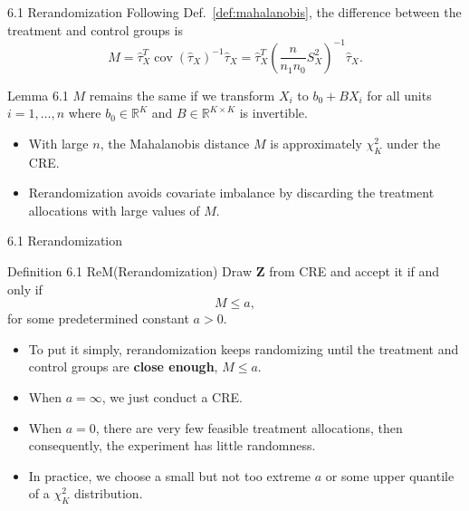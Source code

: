 \documentclass[aspectratio=169, 12pt]{beamer}
\begin{document}
\begin{frame}[label=lemma-6-1]{6.1 Rerandomization}
  Following Def.~\ref{def:mahalanobis}, the difference between the treatment and control groups is 
  \[
  M 
  = \widehat{\tau}_X^T\operatorname{cov}(\widehat{\tau}_X)^{-1}\widehat{\tau}_X 
  = \widehat{\tau}_X^T\left(\frac{n}{n_1n_0}S_X^2\right)^{-1}\widehat{\tau}_X.
  \]
  \begin{keybox}{Lemma 6.1}
    $M$ remains the same if we transform $X_i$ to $b_0+BX_i$ for all units $i=1,\dots,n$ where $b_0\in \mathbb{R}^K$ and $B\in\mathbb{R}^{K\times K}$ is invertible.
    \label{lemma1}
    \vfill
    \hfill\hyperlink{pr-lemma-6-1<1>}{}
  \end{keybox}
  \begin{itemize}
    \item With large $n$, the Mahalanobis distance $M$ is approximately $\chi_K^2$ under the CRE.
    \item Rerandomization avoids covariate imbalance by discarding the treatment allocations with large values of $M$.
  \end{itemize}
\end{frame}

\begin{frame}{6.1 Rerandomization}
  \begin{keybox}{Definition 6.1 ReM(Rerandomization)}
    Draw $\bm{Z}$ from CRE and accept it if and only if 
    \[
    M \leq a,
    \]
    for some predetermined constant $a>0$.
  \end{keybox}
  \begin{itemize}
    \item To put it simply, rerandomization keeps randomizing until the treatment and control groups are \textbf{close enough}, $M \le a$.
    \item When $a=\infty$, we just conduct a CRE.
    \item When $a=0$, there are very few feasible treatment allocations, then consequently, the experiment has little randomness.
    \item In practice, we choose a small but not too extreme $a$ or some upper quantile of a $\chi_K^2$ distribution.
  \end{itemize}
\end{frame}
\end{document}
